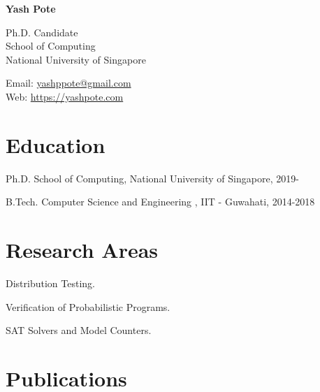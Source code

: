 \documentclass[12pt,letterpaper]{report}
\newcommand{\myname}{Yash Pote}
\newcommand{\namefont}[1]{{\normalfont\bfseries\Huge{#1}}}
\newcommand{\listitemspace}{0.15em}
\renewenvironment{itemize}
{\begin{list}{}{\setlength{\leftmargin}{0em}
            \setlength{\parskip}{0em}
            \setlength{\itemsep}{\listitemspace}
            \setlength{\parsep}{\listitemspace}}}
    {\end{list}}
\begin{document}
    \raggedright

    \namefont{\myname}

    \vspace{1em}
    \begin{minipage}[t]{0.68\textwidth}
    	Ph.D. Candidate \\
        School of Computing \\
		National University of Singapore
    \end{minipage}
    \begin{minipage}[t]{0.31\textwidth}
        Email: \href{mailto:yashppote@gmail.com}{yashppote@gmail.com} \\
        Web: \href{https://yashpote.com}{https://yashpote.com}
    \end{minipage}
    \vspace{0.5em}



    \section*{Education}

    \begin{tablist}

        \item[Ph.D.] \tab School of Computing, National University of Singapore, 2019-

        \item[B.Tech.]  \tab Computer Science and Engineering , IIT - Guwahati, 2014-2018
    \end{tablist}


    \section*{Research Areas}

    \begin{itemize}

	\item Distribution Testing.
	\item Verification of Probabilistic Programs.
	\item SAT Solvers and Model Counters.
	
    \end{itemize}



    \section*{Publications}
\end{document}
